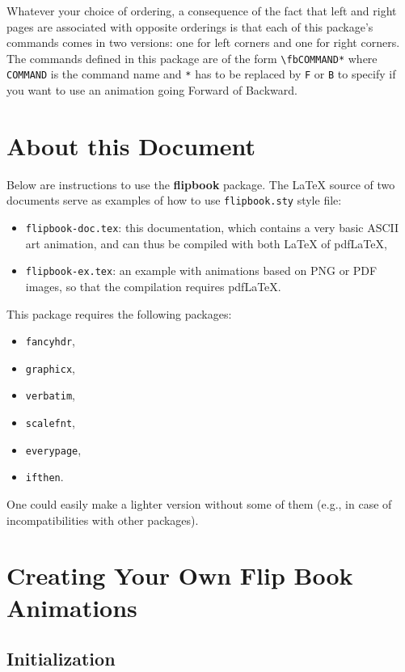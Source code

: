 \documentclass[a4paper,twoside]{article}
\def\flipbook{{\bf flipbook}\xspace}
\begin{document}
Whatever your choice of ordering, a consequence of the fact that left
and right pages are associated with opposite orderings is that each of
this package's commands comes in two versions: one for left corners
and one for right corners. The commands defined in this package are of
the form \verb+\fbCOMMAND*+ where \verb+COMMAND+ is the command name
and \verb+*+ has to be replaced by \verb+F+ or \verb+B+ to specify if
you want to use an animation going Forward of Backward.


\section{About this Document}

Below are instructions to use the \flipbook package. The \LaTeX{}
source of two documents serve as examples of how to use {\tt flipbook.sty}
 style file:
\begin{itemize}
\item {\tt flipbook-doc.tex}: this documentation, which contains a
  very basic ASCII art animation, and can thus be compiled with both
  \LaTeX{} of pdf\LaTeX{},
\item {\tt flipbook-ex.tex}: an example with animations based on PNG or
  PDF images, so that the compilation requires pdf\LaTeX{}.
\end{itemize}

This package requires the following packages:
\begin{itemize}
\item {\tt fancyhdr},
\item {\tt graphicx},
\item {\tt verbatim},
\item {\tt scalefnt},
\item {\tt everypage},
\item {\tt ifthen}.
\end{itemize}
One could easily make a lighter version without some of them (e.g., in
case of incompatibilities with other packages).

\section{Creating Your Own Flip Book Animations}

\subsection{Initialization}
\end{document}

